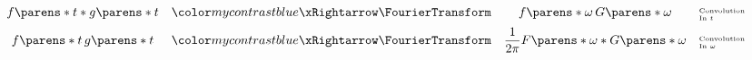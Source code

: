 \begin{multicols}{2}
\begin{CheatsheetEntryFrame}
\begin{equation*}
\begin{array}{cccl}
                f\parens*{t} * g\parens*{t}
                &\TmpFTArrow&
                f\parens*{\omega} \, G\parens*{\omega}
                & \text{\tiny\parbox{6em}{Convolution\\In $t$}}
                \\[0.6em]
                {\displaystyle f\parens*{t} \, g\parens*{t}}
                &\TmpFTArrow&
                {\displaystyle
                    \frac{1}{2 \pi} F\parens*{\omega} * G\parens*{\omega}
                }
                & \text{\tiny\parbox{6em}{Convolution\\In $\omega$}}
            \end{array}
        \end{equation*}

    \end{CheatsheetEntryFrame}

    \begin{CheatsheetEntryFrame}


\end{CheatsheetEntryFrame}
\end{multicols}
